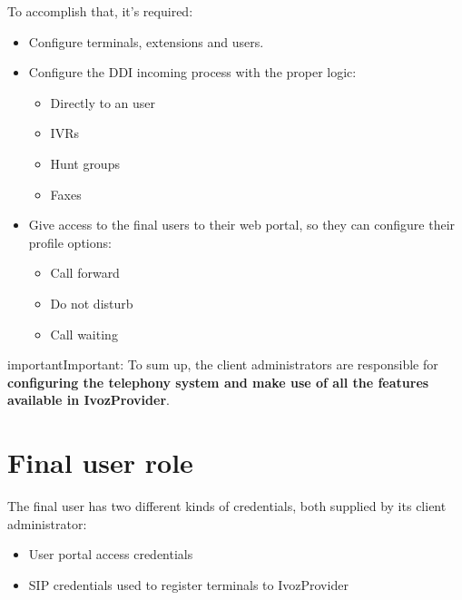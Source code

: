 \documentclass[letterpaper,10pt,english]{sphinxmanual}
\begin{document}
To accomplish that, it's required:
\begin{itemize}
\item {} 
Configure terminals, extensions and users.

\item {} 
Configure the DDI incoming process with the proper logic:
\begin{itemize}
\item {} 
Directly to an user

\item {} 
IVRs

\item {} 
Hunt groups

\item {} 
Faxes

\end{itemize}

\item {} 
Give access to the final users to their web portal, so they can configure
their profile options:
\begin{itemize}
\item {} 
Call forward

\item {} 
Do not disturb

\item {} 
Call waiting

\end{itemize}

\end{itemize}

\begin{notice}{important}{Important:}
To sum up, the client administrators are responsible for
\textbf{configuring the telephony system and make use of all the
features available in IvozProvider}.
\end{notice}


\section{Final user role}
\label{basic_concepts/operation_roles/index:final-user-role}
The final user has two different kinds of credentials, both supplied by
its client administrator:
\begin{itemize}
\item {} 
User portal access credentials

\item {} 
SIP credentials used to register terminals to IvozProvider

\end{itemize}
\end{document}
